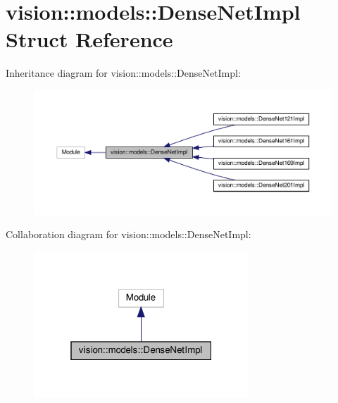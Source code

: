 \hypertarget{structvision_1_1models_1_1DenseNetImpl}{}\section{vision\+:\+:models\+:\+:Dense\+Net\+Impl Struct Reference}
\label{structvision_1_1models_1_1DenseNetImpl}


Inheritance diagram for vision\+:\+:models\+:\+:Dense\+Net\+Impl\+:
\nopagebreak
\begin{figure}[H]
\begin{center}
\leavevmode
\includegraphics[width=350pt]{structvision_1_1models_1_1DenseNetImpl__inherit__graph}
\end{center}
\end{figure}


Collaboration diagram for vision\+:\+:models\+:\+:Dense\+Net\+Impl\+:
\nopagebreak
\begin{figure}[H]
\begin{center}
\leavevmode
\includegraphics[width=229pt]{structvision_1_1models_1_1DenseNetImpl__coll__graph}
\end{center}
\end{figure}
